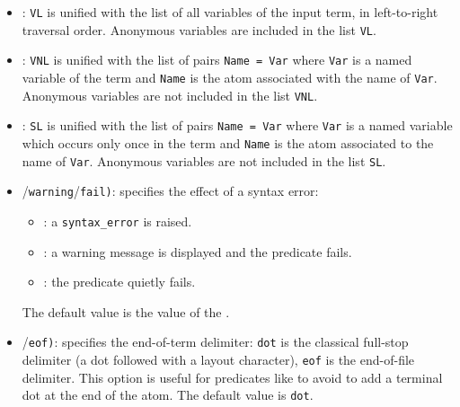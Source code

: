 \begin{itemize}

\item {}: \texttt{VL} is unified with the
list of all variables of the input term, in left-to-right traversal
order. Anonymous variables are included in the list \texttt{VL}.

\item {}: \texttt{VNL} is
unified with the list of pairs \texttt{Name = Var} where \texttt{Var} is a
named variable of the term and \texttt{Name} is the atom associated with the
name of \texttt{Var}.  Anonymous variables are not included in the list
\texttt{VNL}.

\item {}: \texttt{SL} is unified with the
list of pairs \texttt{Name = Var} where \texttt{Var} is a named variable
which occurs only once in the term and \texttt{Name} is the atom associated
to the name of \texttt{Var}. Anonymous variables are not included in the list
\texttt{SL}.

\item {}/\texttt{warning}/\texttt{fail)}:
specifies the effect of a syntax error:

\begin{itemize}

\item {}: a \texttt{syntax\_error} is raised.

\item {}: a warning message is displayed and the predicate
fails.

\item {}: the predicate quietly fails.

\end{itemize}

The default value is the value of the 
 .

\item {}/\texttt{eof)}: specifies the
end-of-term delimiter: \texttt{dot} is the classical full-stop delimiter (a
dot followed with a layout character), \texttt{eof} is the end-of-file
delimiter. This option is useful for predicates like
  to avoid to add a
terminal dot at the end of the atom. The default value is \texttt{dot}.

\end{itemize}

